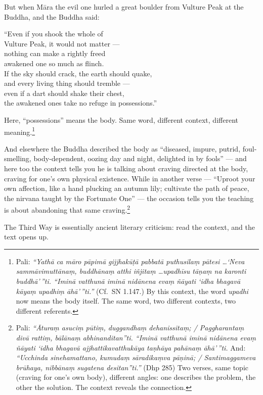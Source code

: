 But when Māra the evil one hurled a great boulder from Vulture Peak at the Buddha, and the Buddha said:

\begin{versebox}
``Even if you shook the whole of\\
Vulture Peak, it would not matter ---\\
nothing can make a rightly freed\\
awakened one so much as flinch.\\[4pt]
If the sky should crack, the earth should quake,\\
and every living thing should tremble ---\\
even if a dart should shake their chest,\\
the awakened ones take no refuge in possessions.''
\end{versebox}

Here, ``possessions'' means the body. Same word, different context, different meaning.\footnote{Pali: \textit{``Yathā ca māro pāpimā gijjhakūṭā pabbatā puthusilaṃ pātesi \ldots `Neva sammāvimuttānaṃ, buddhānaṃ atthi iñjitaṃ \ldots upadhīsu tāṇaṃ na karonti buddhā'\,''ti. ``Iminā vatthunā iminā nidānena evaṃ ñāyati `idha bhagavā kāyaṃ upadhiṃ āhā'\,''ti.''} (Cf.\ SN 1.147.) By this context, the word \textit{upadhi} now means the body itself. The same word, two different contexts, two different referents.}

And elsewhere the Buddha described the body as ``diseased, impure, putrid, foul-smelling, body-dependent, oozing day and night, delighted in by fools'' --- and here too the context tells you he is talking about craving directed at the body, craving for one's own physical existence. While in another verse --- ``Uproot your own affection, like a hand plucking an autumn lily; cultivate the path of peace, the nirvana taught by the Fortunate One'' --- the occasion tells you the teaching is about abandoning that same craving.\footnote{Pali: \textit{``Āturaṃ asuciṃ pūtiṃ, duggandhaṃ dehanissitaṃ; / Paggharantaṃ divā rattiṃ, bālānaṃ abhinanditan''ti. ``Iminā vatthunā iminā nidānena evaṃ ñāyati `idha bhagavā ajjhattikavatthukāya taṇhāya pahānaṃ āhā'\,''ti.} And: \textit{``Ucchinda sinehamattano, kumudaṃ sāradikaṃva pāṇinā; / Santimaggameva brūhaya, nibbānaṃ sugatena desitan''ti.''} (Dhp 285) Two verses, same topic (craving for one's own body), different angles: one describes the problem, the other the solution. The context reveals the connection.}

The Third Way is essentially ancient literary criticism: read the context, and the text opens up.

